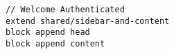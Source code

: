 
\lstset{language=lisp}

\begin{lstlisting}[frame=single]
// Welcome Authenticated
extend shared/sidebar-and-content
block append head
block append content
\end{lstlisting}